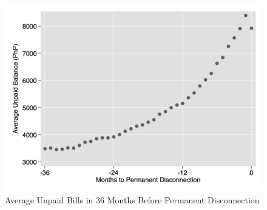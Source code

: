 \documentclass[12pt,table]{article}
\begin{document}
\pagebreak



\begin{figure}[!ht]
\caption{Average Unpaid Bills in 36 Months Before Permanent Disconnection}\label{figure:billtodc}
\begin{center}
\includegraphics[scale=.4]{tables/pay_to_dc_graph.png}
\end{center}
\end{figure}



\end{document}
